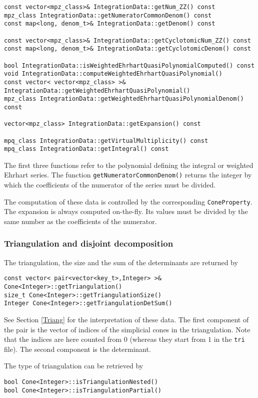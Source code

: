 \documentclass[12pt,a4paper]{scrartcl}
\theoremstyle{definition}
\begin{document}
\begin{small}
\begin{Verbatim}
const vector<mpz_class>& IntegrationData::getNum_ZZ() const
mpz_class IntegrationData::getNumeratorCommonDenom() const
const map<long, denom_t>& IntegrationData::getDenom() const

const vector<mpz_class>& IntegrationData::getCyclotomicNum_ZZ() const
const map<long, denom_t>& IntegrationData::getCyclotomicDenom() const

bool IntegrationData::isWeightedEhrhartQuasiPolynomialComputed() const
void IntegrationData::computeWeightedEhrhartQuasiPolynomial()
const vector< vector<mpz_class> >& IntegrationData::getWeightedEhrhartQuasiPolynomial()
mpz_class IntegrationData::getWeightedEhrhartQuasiPolynomialDenom() const

vector<mpz_class> IntegrationData::getExpansion() const

mpq_class IntegrationData::getVirtualMultiplicity() const
mpq_class IntegrationData::getIntegral() const
\end{Verbatim}

The first three functions refer to the polynomial defining the integral or weighted Ehrhart series. The function \verb|getNumeratorCommonDenom()| returns the integer by which the coefficients of the numerator of the series must be divided.

The computation of these data is controlled by the corresponding \verb|ConeProperty|. The expansion is always  computed on-the-fly. Its values must be divided by the same number as the coefficients of the numerator.

\subsubsection{Triangulation and disjoint decomposition}

The triangulation, the size and the sum of the determinants are returned by
\begin{Verbatim}
const vector< pair<vector<key_t>,Integer> >& Cone<Integer>::getTriangulation()
size_t Cone<Integer>::getTriangulationSize()
Integer Cone<Integer>::getTriangulationDetSum() 
\end{Verbatim}
See Section \ref{Triang} for the interpretation of these data. The first component of the pair is the vector of indices of the simplicial cones in the triangulation. Note that the indices are here counted from $0$ (whereas they start from $1$ in the \verb|tri| file). The second component is the determinant.

The type of triangulation can be retrieved by
\begin{Verbatim}
bool Cone<Integer>::isTriangulationNested()
bool Cone<Integer>::isTriangulationPartial()
\end{Verbatim}


\end{small}
\end{document}
